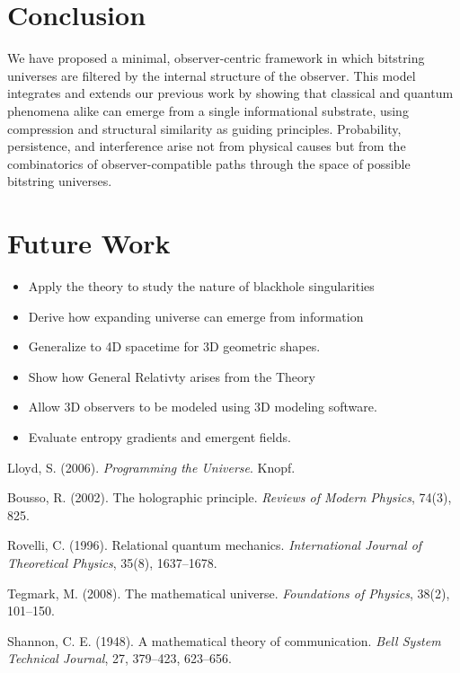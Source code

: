 \documentclass[12pt]{article}
\begin{document}
\section{Conclusion}

We have proposed a minimal, observer-centric framework in which bitstring universes are filtered by the internal structure of the observer. This model integrates and extends our previous work by showing that classical and quantum phenomena alike can emerge from a single informational substrate, using compression and structural similarity as guiding principles. Probability, persistence, and interference arise not from physical causes but from the combinatorics of observer-compatible paths through the space of possible bitstring universes.

\section{Future Work}

\begin{itemize}
    \item  Apply the theory to study the nature of blackhole singularities
    \item  Derive how expanding universe can emerge from information
    \item  Generalize to 4D spacetime for 3D geometric shapes.
    \item  Show how General Relativty arises from the Theory
    \item  Allow 3D observers to be modeled using 3D modeling software.
    \item  Evaluate entropy gradients and emergent fields.
\end{itemize}



\begin{thebibliography}{9}
    Lloyd, S. (2006). \textit{Programming the Universe}. Knopf.

    Bousso, R. (2002). The holographic principle. \textit{Reviews of Modern Physics}, 74(3), 825.

    Rovelli, C. (1996). Relational quantum mechanics. \textit{International Journal of Theoretical Physics}, 35(8), 1637–1678.

    Tegmark, M. (2008). The mathematical universe. \textit{Foundations of Physics}, 38(2), 101–150.

    Shannon, C. E. (1948). A mathematical theory of communication. \textit{Bell System Technical Journal}, 27, 379–423, 623–656.
\end{thebibliography}
\end{document}
